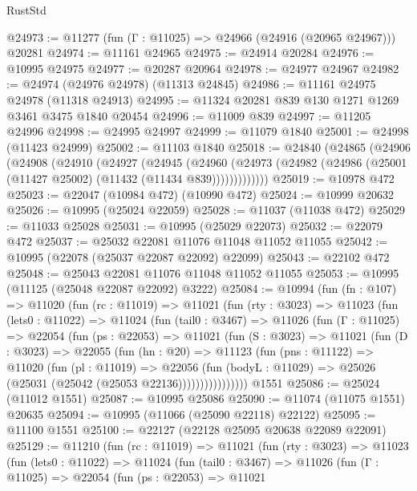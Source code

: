 \begin{lexlean}{RustStd}
\begin{coremodule}
@24973 := @11277 (fun (Γ : @11025) => @24966 (@24916 (@20965 @24967))) @20281
@24974 := @11161 @24965
@24975 := @24914 @20284
@24976 := @10995 @24975
@24977 := @20287 @20964
@24978 := @24977 @24967
@24982 := @24974 (@24976 @24978) (@11313 @24845)
@24986 := @11161 @24975 @24978 (@11318 @24913)
@24995 := @11324 @20281 @839 @130 @1271 @1269 @3461 @3475 @1840 @20454
@24996 := @11009 @839
@24997 := @11205 @24996
@24998 := @24995 @24997
@24999 := @11079 @1840
@25001 := @24998 (@11423 @24999)
@25002 := @11103 @1840
@25018 := @24840
    (@24865
      (@24906
        (@24908
          (@24910
            (@24927
              (@24945
                (@24960
                  (@24973 (@24982 (@24986 (@25001 (@11427 @25002) (@11432 (@11434 @839)))))))))))))
@25019 := @10978 @472
@25023 := @22047 (@10984 @472) (@10990 @472)
@25024 := @10999 @20632
@25026 := @10995 (@25024 @22059)
@25028 := @11037 (@11038 @472)
@25029 := @11033 @25028
@25031 := @10995 (@25029 @22073)
@25032 := @22079 @472
@25037 := @25032 @22081 @11076 @11048 @11052 @11055
@25042 := @10995 (@22078 (@25037 @22087 @22092) @22099)
@25043 := @22102 @472
@25048 := @25043 @22081 @11076 @11048 @11052 @11055
@25053 := @10995 (@11125 (@25048 @22087 @22092) @3222)
@25084 := @10994
    (fun (fn : @107) =>
    @11020
      (fun (rc : @11019) =>
      @11021
        (fun (rty : @3023) =>
        @11023
          (fun (lets0 : @11022) =>
          @11024
            (fun (tail0 : @3467) =>
            @11026
              (fun (Γ : @11025) =>
              @22054
                (fun (ps : @22053) =>
                @11021
                  (fun (S : @3023) =>
                  @11021
                    (fun (D : @3023) =>
                    @22055
                      (fun (hn : @20) =>
                      @11123
                        (fun (pns : @11122) =>
                        @11020
                          (fun (pl : @11019) =>
                          @22056
                            (fun (bodyL : @11029) =>
                            @25026 (@25031 (@25042 (@25053 @22136))))))))))))))))
    @1551
@25086 := @25024 (@11012 @1551)
@25087 := @10995 @25086
@25090 := @11074 (@11075 @1551) @20635
@25094 := @10995 (@11066 (@25090 @22118) @22122)
@25095 := @11100 @1551
@25100 := @22127 (@22128 @25095 @20638 @22089 @22091)
@25129 := @11210
    (fun (rc : @11019) =>
    @11021
      (fun (rty : @3023) =>
      @11023
        (fun (lets0 : @11022) =>
        @11024
          (fun (tail0 : @3467) =>
          @11026
            (fun (Γ : @11025) =>
            @22054
              (fun (ps : @22053) =>
              @11021

\end{coremodule}
\end{lexlean}
